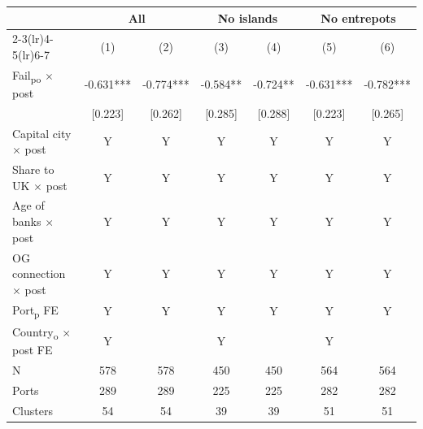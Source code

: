 {
\def\sym#1{\ifmmode^{#1}\else\(^{#1}\)\fi}
\begin{tabular}{l*{6}{c}}
\toprule
            &\multicolumn{2}{c}{All}        &\multicolumn{2}{c}{No islands} &\multicolumn{2}{c}{No entrepots}\\\cmidrule(lr){2-3}\cmidrule(lr){4-5}\cmidrule(lr){6-7}
            &\multicolumn{1}{c}{(1)}   &\multicolumn{1}{c}{(2)}   &\multicolumn{1}{c}{(3)}   &\multicolumn{1}{c}{(4)}   &\multicolumn{1}{c}{(5)}   &\multicolumn{1}{c}{(6)}   \\
\midrule
Fail\textsubscript{po} $\times$ post&      -0.631***&      -0.774***&      -0.584** &      -0.724** &      -0.631***&      -0.782***\\
            &     [0.223]   &     [0.262]   &     [0.285]   &     [0.288]   &     [0.223]   &     [0.265]   \\
Capital city $\times$ post &           Y   &           Y   &           Y   &           Y   &           Y   &           Y   \\
Share to UK $\times$ post &           Y   &           Y   &           Y   &           Y   &           Y   &           Y   \\
Age of banks $\times$ post&           Y   &           Y   &           Y   &           Y   &           Y   &           Y   \\
OG connection $\times$ post&           Y   &           Y   &           Y   &           Y   &           Y   &           Y   \\
Port\textsubscript{p} FE &           Y   &           Y   &           Y   &           Y   &           Y   &           Y   \\
Country\textsubscript{o} $\times$ post FE &           Y   &               &           Y   &               &           Y   &               \\
\midrule
N           &         578   &         578   &         450   &         450   &         564   &         564   \\
Ports       &         289   &         289   &         225   &         225   &         282   &         282   \\
Clusters    &          54   &          54   &          39   &          39   &          51   &          51   \\
\bottomrule
\end{tabular}
}
